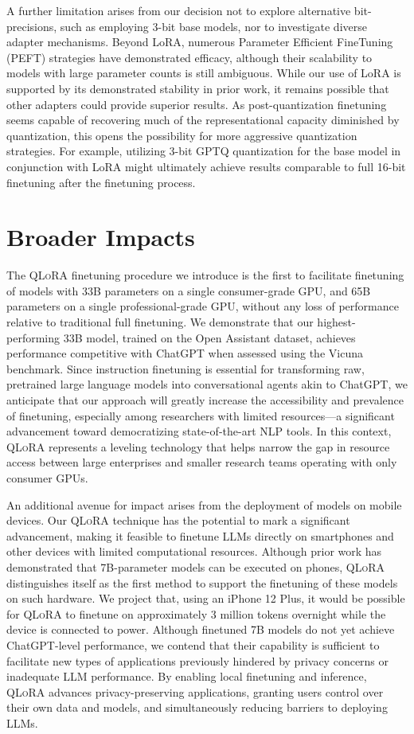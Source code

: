 A further limitation arises from our decision not to explore alternative bit-precisions, such as employing 3-bit base models, nor to investigate diverse adapter mechanisms. Beyond LoRA, numerous Parameter Efficient FineTuning (PEFT) strategies have demonstrated efficacy, although their scalability to models with large parameter counts is still ambiguous. While our use of LoRA is supported by its demonstrated stability in prior work, it remains possible that other adapters could provide superior results. As post-quantization finetuning seems capable of recovering much of the representational capacity diminished by quantization, this opens the possibility for more aggressive quantization strategies. For example, utilizing 3-bit GPTQ quantization for the base model in conjunction with LoRA might ultimately achieve results comparable to full 16-bit finetuning after the finetuning process.

\section{Broader Impacts}

The \textsc{QLoRA} finetuning procedure we introduce is the first to facilitate finetuning of models with 33B parameters on a single consumer-grade GPU, and 65B parameters on a single professional-grade GPU, without any loss of performance relative to traditional full finetuning. We demonstrate that our highest-performing 33B model, trained on the Open Assistant dataset, achieves performance competitive with ChatGPT when assessed using the Vicuna benchmark. Since instruction finetuning is essential for transforming raw, pretrained large language models into conversational agents akin to ChatGPT, we anticipate that our approach will greatly increase the accessibility and prevalence of finetuning, especially among researchers with limited resources—a significant advancement toward democratizing state-of-the-art NLP tools. In this context, \textsc{QLoRA} represents a leveling technology that helps narrow the gap in resource access between large enterprises and smaller research teams operating with only consumer GPUs.

An additional avenue for impact arises from the deployment of models on mobile devices. Our \textsc{QLoRA} technique has the potential to mark a significant advancement, making it feasible to finetune LLMs directly on smartphones and other devices with limited computational resources. Although prior work has demonstrated that 7B-parameter models can be executed on phones, \textsc{QLoRA} distinguishes itself as the first method to support the finetuning of these models on such hardware. We project that, using an iPhone 12 Plus, it would be possible for \textsc{QLoRA} to finetune on approximately 3 million tokens overnight while the device is connected to power. Although finetuned 7B models do not yet achieve ChatGPT-level performance, we contend that their capability is sufficient to facilitate new types of applications previously hindered by privacy concerns or inadequate LLM performance. By enabling local finetuning and inference, \textsc{QLoRA} advances privacy-preserving applications, granting users control over their own data and models, and simultaneously reducing barriers to deploying LLMs.


